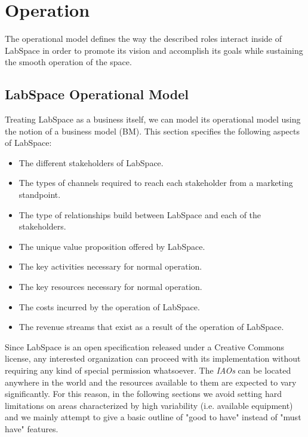 \documentclass[a4paper, 11pt]{article}
\begin{document}


\section{Operation}

The operational model defines the way the described roles interact inside of LabSpace in order to promote its vision and accomplish its goals while sustaining the smooth operation of the space.

\subsection{LabSpace Operational Model}

Treating LabSpace as a business itself, we can model its operational model using the notion of a business model (BM). This section specifies the following aspects of LabSpace:

\begin{itemize}[noitemsep]
    \item The different stakeholders of LabSpace.
    \item The types of channels required to reach each stakeholder from a marketing standpoint.
    \item The type of relationships build between LabSpace and each of the stakeholders.
    \item The unique value proposition offered by LabSpace.
    \item The key activities necessary for normal operation.
    \item The key resources necessary for normal operation.
    \item The costs incurred by the operation of LabSpace.
    \item The revenue streams that exist as a result of the operation of LabSpace.
\end{itemize}

Since LabSpace is an open specification released under a Creative Commons license, any interested organization can proceed with its implementation without requiring any kind of special permission whatsoever. The \textit{IAOs} can be located anywhere in the world and the resources available to them are expected to vary significantly. For this reason, in the following sections we avoid setting hard limitations on areas characterized by high variability (i.e. available equipment) and we mainly attempt to give a basic outline of "good to have" instead of "must have" features.
\end{document}
